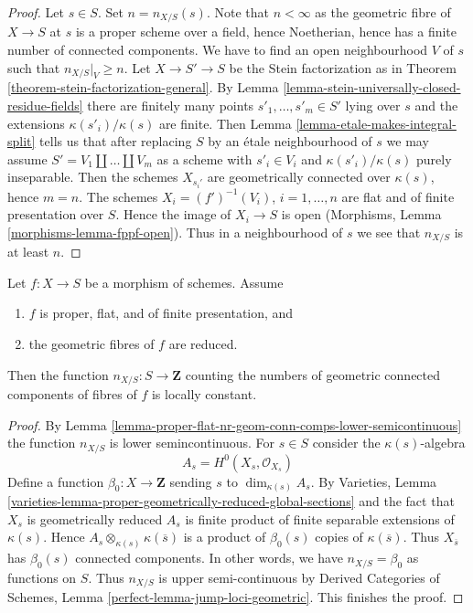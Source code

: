 \begin{proof}
Let $s \in S$. Set $n = n_{X/S}(s)$. Note that $n < \infty$ as the geometric
fibre of $X \to S$ at $s$ is a proper scheme over a field, hence Noetherian,
hence has a finite number of connected components. We have to find an open
neighbourhood $V$ of $s$ such that $n_{X/S}|_V \geq n$.
Let $X \to S' \to S$ be the Stein factorization as in
Theorem \ref{theorem-stein-factorization-general}.
By Lemma \ref{lemma-stein-universally-closed-residue-fields}
there are finitely many points $s'_1, \ldots, s'_m \in S'$ lying over $s$
and the extensions $\kappa(s'_i)/\kappa(s)$ are finite.
Then Lemma \ref{lemma-etale-makes-integral-split}
tells us that after replacing $S$ by an \'etale neighbourhood
of $s$ we may assume $S' = V_1 \amalg \ldots \amalg V_m$ as a scheme
with $s'_i \in V_i$ and $\kappa(s'_i)/\kappa(s)$ purely inseparable.
Then the schemes $X_{s_i'}$ are geometrically connected over
$\kappa(s)$, hence $m = n$. The schemes
$X_i = (f')^{-1}(V_i)$, $i = 1, \ldots, n$
are flat and of finite presentation over $S$. Hence the image of $X_i \to S$
is open (Morphisms, Lemma \ref{morphisms-lemma-fppf-open}).
Thus in a neighbourhood of $s$ we see that $n_{X/S}$ is
at least $n$.
\end{proof}

\begin{lemma}
\label{lemma-proper-flat-geom-red}
Let $f : X \to S$ be a morphism of schemes. Assume
\begin{enumerate}
\item $f$ is proper, flat, and of finite presentation, and
\item the geometric fibres of $f$ are reduced.
\end{enumerate}
Then the function $n_{X/S} : S \to \mathbf{Z}$
counting the numbers of geometric connected components
of fibres of $f$ is locally constant.
\end{lemma}

\begin{proof}
By Lemma \ref{lemma-proper-flat-nr-geom-conn-comps-lower-semicontinuous}
the function $n_{X/S}$ is lower semincontinuous.
For $s \in S$ consider the $\kappa(s)$-algebra
$$
A_s = H^0(X_s, \mathcal{O}_{X_s})
$$
Define a function $\beta_0 : X \to \mathbf{Z}$ sending
$s$ to $\dim_{\kappa(s)} A_s$.
By Varieties, Lemma
\ref{varieties-lemma-proper-geometrically-reduced-global-sections}
and the fact that $X_s$ is geometrically reduced
$A_s$ is finite product of finite separable extensions of $\kappa(s)$.
Hence $A_s \otimes_{\kappa(s)} \kappa(\overline{s})$ is a product
of $\beta_0(s)$ copies of $\kappa(\overline{s})$. Thus
$X_{\overline{s}}$ has $\beta_0(s)$ connected components.
In other words, we have $n_{X/S} = \beta_0$
as functions on $S$. Thus $n_{X/S}$ is upper semi-continuous by
Derived Categories of Schemes, Lemma \ref{perfect-lemma-jump-loci-geometric}.
This finishes the proof.
\end{proof}

